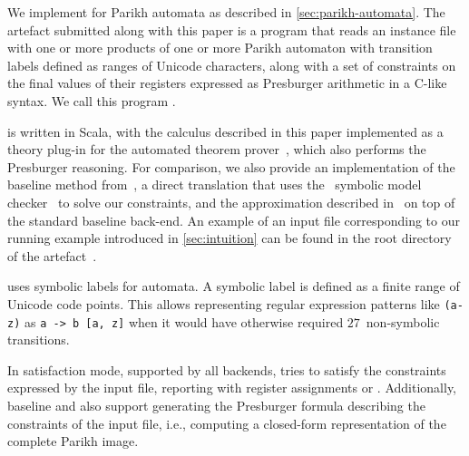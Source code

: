 
We implement \Calculus{} for Parikh automata as described in
\cref{sec:parikh-automata}. The artefact submitted along with this paper is a
program that reads an instance file with one or more products of one or more
Parikh automaton with transition labels defined as ranges of Unicode characters,
along with a set of constraints on the final values of their registers expressed
as Presburger arithmetic in a C-like syntax. We call this program
\Catra.

\Catra{} is written in Scala, with the calculus described in this paper
implemented as a theory plug-in for the \Princess{} automated theorem
prover~\cite{princess}, which also performs the Presburger reasoning. For
comparison, we also provide an implementation of the baseline method
from~\cite{generate-parikh-image}, a direct translation that uses the~\Nuxmv{}
symbolic model checker~\cite{nuxmv} to solve our constraints, and the
approximation described in~\cite{approximate-parikh} on top of the standard
baseline back-end. An example of an input file corresponding to our running
example introduced in \cref{sec:intuition} can be found in the root directory
of the artefact~\cite{artefact}.

\Catra{} uses symbolic labels for automata. A symbolic label is defined as a
finite range of Unicode code points. This allows representing regular expression
patterns like \lstinline{(a-z)} as \lstinline{a -> b [a, z]} when it would have
otherwise required $27$~non-symbolic transitions. 

In satisfaction mode, supported by all backends, \Catra{} tries to satisfy the
constraints expressed by the input file, reporting \Sat{} with register
assignments or \Unsat{}. Additionally, baseline and \Calculus{} also support
generating the Presburger formula describing the constraints of the input file,
i.e., computing a closed-form representation of the complete Parikh image.


